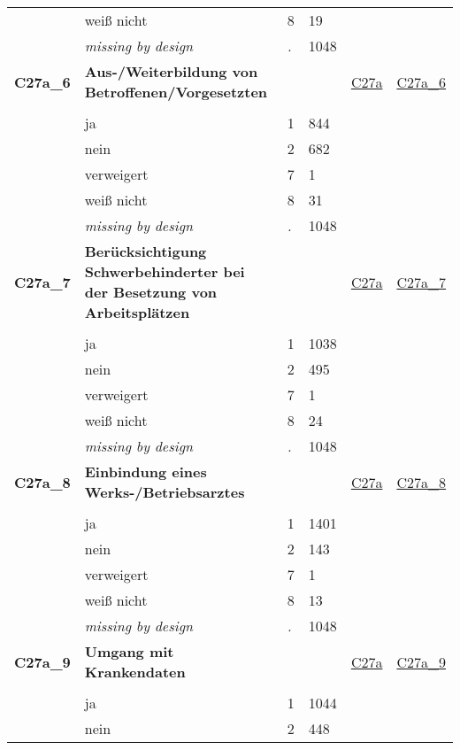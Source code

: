 \begin{longtable}{| L{2.45cm} | L{6cm} | C{1.5cm} | R{1cm} | C{2.25cm} | C{2.25cm} |}
   & weiß nicht & 8 & 19 &  &  \\ 
   & \textit{missing by design} & \textit{.} & 1048 &  &  \\ 
   \midrule
\textbf{C27a\_6}\label{var:C27a:6} & \textbf{Aus-/Weiterbildung von Betroffenen/Vorgesetzten} &  &  & \hyperref[C27a]{C27a} & \hyperref[var:suf:C27a:6]{C27a\_6} \\ 
   &  &  &  &  &  \\ 
   & ja & 1 & 844 &  &  \\ 
   & nein & 2 & 682 &  &  \\ 
   & verweigert & 7 & 1 &  &  \\ 
   & weiß nicht & 8 & 31 &  &  \\ 
   & \textit{missing by design} & \textit{.} & 1048 &  &  \\ 
   \midrule
\textbf{C27a\_7}\label{var:C27a:7} & \textbf{Berücksichtigung Schwerbehinderter bei der Besetzung von Arbeitsplätzen} &  &  & \hyperref[C27a]{C27a} & \hyperref[var:suf:C27a:7]{C27a\_7} \\ 
   &  &  &  &  &  \\ 
   & ja & 1 & 1038 &  &  \\ 
   & nein & 2 & 495 &  &  \\ 
   & verweigert & 7 & 1 &  &  \\ 
   & weiß nicht & 8 & 24 &  &  \\ 
   & \textit{missing by design} & \textit{.} & 1048 &  &  \\ 
   \midrule
\textbf{C27a\_8}\label{var:C27a:8} & \textbf{Einbindung eines Werks-/Betriebsarztes} &  &  & \hyperref[C27a]{C27a} & \hyperref[var:suf:C27a:8]{C27a\_8} \\ 
   &  &  &  &  &  \\ 
   & ja & 1 & 1401 &  &  \\ 
   & nein & 2 & 143 &  &  \\ 
   & verweigert & 7 & 1 &  &  \\ 
   & weiß nicht & 8 & 13 &  &  \\ 
   & \textit{missing by design} & \textit{.} & 1048 &  &  \\ 
   \midrule
\textbf{C27a\_9}\label{var:C27a:9} & \textbf{Umgang mit Krankendaten} &  &  & \hyperref[C27a]{C27a} & \hyperref[var:suf:C27a:9]{C27a\_9} \\ 
   &  &  &  &  &  \\ 
   & ja & 1 & 1044 &  &  \\ 
   & nein & 2 & 448 &  &  \\ 

\end{longtable}
